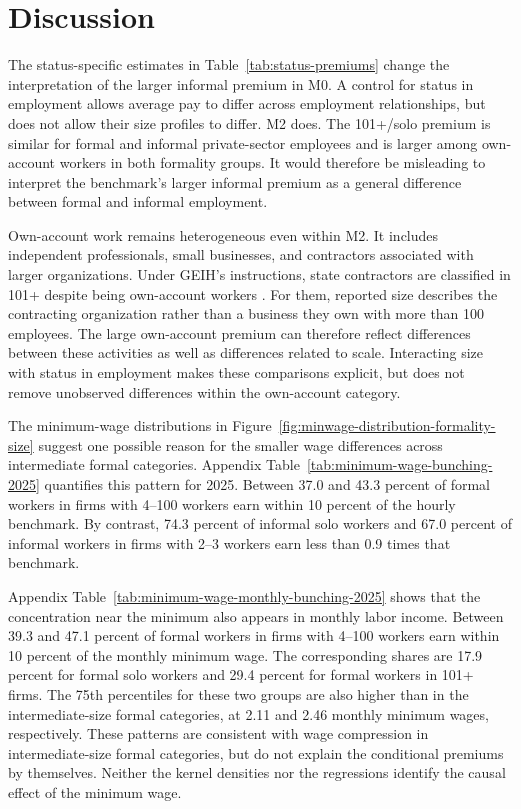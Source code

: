 \section{Discussion}
\label{sec:discussion}

The status-specific estimates in Table~\ref{tab:status-premiums} change
the interpretation of the larger informal premium in M0. A control for status
in employment allows average pay to differ across employment relationships,
but does not allow their size profiles to differ. M2 does. The 101+/solo
premium is similar for formal and informal private-sector employees and is
larger among own-account workers in both formality groups. It would therefore
be misleading to interpret the benchmark's larger informal premium as a
general difference between formal and informal employment.

Own-account work remains heterogeneous even within M2. It includes independent
professionals, small businesses, and contractors associated with larger
organizations. Under GEIH's instructions, state contractors are classified
in 101+ despite being own-account workers \citep{DANE2025GEIHManual}.
For them, reported size describes the contracting organization rather than
a business they own with more than 100 employees. The large own-account
premium can therefore reflect differences between these activities as well
as differences related to scale. Interacting size with status in employment
makes these comparisons explicit, but does not remove unobserved differences
within the own-account category.

The minimum-wage distributions in
Figure~\ref{fig:minwage-distribution-formality-size} suggest one possible reason
for the smaller wage differences across intermediate formal categories.
Appendix Table~\ref{tab:minimum-wage-bunching-2025} quantifies this pattern
for 2025. Between 37.0 and 43.3 percent of formal workers in firms with
4--100 workers earn within 10 percent of the hourly benchmark. By contrast,
74.3 percent of informal solo workers and 67.0 percent of informal workers
in firms with 2--3 workers earn less than 0.9 times that benchmark.

Appendix Table~\ref{tab:minimum-wage-monthly-bunching-2025} shows that
the concentration near the minimum also appears in monthly labor
income. Between 39.3 and 47.1 percent of formal workers in firms with
4--100 workers earn within 10 percent of the monthly minimum wage. The corresponding shares are
17.9 percent for formal solo workers and 29.4 percent for formal workers in
101+ firms. The 75th percentiles for these two groups are also higher than
in the intermediate-size formal categories, at 2.11 and 2.46 monthly minimum
wages, respectively. These patterns are consistent with wage compression in
intermediate-size formal categories, but do not explain the conditional premiums
by themselves.
Neither the kernel densities nor the regressions identify the causal effect
of the minimum wage.

